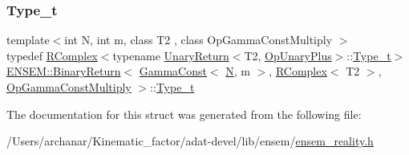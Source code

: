 \subsubsection{\texorpdfstring{Type\_t}{Type\_t}\hspace{0.1cm}{\footnotesize\ttfamily [3/3]}}
{\footnotesize\ttfamily template$<$int N, int m, class T2 , class Op\+Gamma\+Const\+Multiply $>$ \\
typedef \mbox{\hyperlink{classENSEM_1_1RComplex}{R\+Complex}}$<$typename \mbox{\hyperlink{structENSEM_1_1UnaryReturn}{Unary\+Return}}$<$T2, \mbox{\hyperlink{structENSEM_1_1OpUnaryPlus}{Op\+Unary\+Plus}}$>$\+::\mbox{\hyperlink{structENSEM_1_1BinaryReturn_3_01GammaConst_3_01N_00_01m_01_4_00_01RComplex_3_01T2_01_4_00_01OpGammaConstMultiply_01_4_ae674dff24be99861079dc4dea357e362}{Type\+\_\+t}}$>$ \mbox{\hyperlink{structENSEM_1_1BinaryReturn}{E\+N\+S\+E\+M\+::\+Binary\+Return}}$<$ \mbox{\hyperlink{classENSEM_1_1GammaConst}{Gamma\+Const}}$<$ \mbox{\hyperlink{adat__devel_2lib_2hadron_2operator__name__util_8cc_a7722c8ecbb62d99aee7ce68b1752f337}{N}}, m $>$, \mbox{\hyperlink{classENSEM_1_1RComplex}{R\+Complex}}$<$ T2 $>$, \mbox{\hyperlink{structENSEM_1_1OpGammaConstMultiply}{Op\+Gamma\+Const\+Multiply}} $>$\+::\mbox{\hyperlink{structENSEM_1_1BinaryReturn_3_01GammaConst_3_01N_00_01m_01_4_00_01RComplex_3_01T2_01_4_00_01OpGammaConstMultiply_01_4_ae674dff24be99861079dc4dea357e362}{Type\+\_\+t}}}



The documentation for this struct was generated from the following file\+:\begin{DoxyCompactItemize}
\item 
/\+Users/archanar/\+Kinematic\+\_\+factor/adat-\/devel/lib/ensem/\mbox{\hyperlink{adat-devel_2lib_2ensem_2ensem__reality_8h}{ensem\+\_\+reality.\+h}}\end{DoxyCompactItemize}
